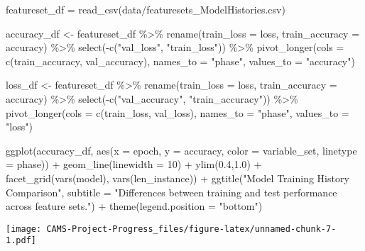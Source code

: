 \documentclass[
]{book}
\newenvironment{Shaded}{\begin{snugshade}}{\end{snugshade}}
\newcommand{\AttributeTok}[1]{\textcolor[rgb]{0.77,0.63,0.00}{#1}}
\newcommand{\DecValTok}[1]{\textcolor[rgb]{0.00,0.00,0.81}{#1}}
\newcommand{\FloatTok}[1]{\textcolor[rgb]{0.00,0.00,0.81}{#1}}
\newcommand{\FunctionTok}[1]{\textcolor[rgb]{0.00,0.00,0.00}{#1}}
\newcommand{\NormalTok}[1]{#1}
\newcommand{\OtherTok}[1]{\textcolor[rgb]{0.56,0.35,0.01}{#1}}
\newcommand{\SpecialCharTok}[1]{\textcolor[rgb]{0.00,0.00,0.00}{#1}}
\newcommand{\StringTok}[1]{\textcolor[rgb]{0.31,0.60,0.02}{#1}}
\begin{document}
\begin{Shaded}
\begin{Highlighting}[]
\NormalTok{featureset\_df }\OtherTok{=} \FunctionTok{read\_csv}\NormalTok{(}\StringTok{\textquotesingle{}data/featuresets\_ModelHistories.csv\textquotesingle{}}\NormalTok{)}

\NormalTok{accuracy\_df }\OtherTok{\textless{}{-}}\NormalTok{ featureset\_df }\SpecialCharTok{\%\textgreater{}\%}
  \FunctionTok{rename}\NormalTok{(}\AttributeTok{train\_loss =}\NormalTok{ loss, }\AttributeTok{train\_accuracy =}\NormalTok{ accuracy) }\SpecialCharTok{\%\textgreater{}\%}
  \FunctionTok{select}\NormalTok{(}\SpecialCharTok{{-}}\FunctionTok{c}\NormalTok{(}\StringTok{"val\_loss"}\NormalTok{, }\StringTok{"train\_loss"}\NormalTok{)) }\SpecialCharTok{\%\textgreater{}\%}
  \FunctionTok{pivot\_longer}\NormalTok{(}\AttributeTok{cols =} \FunctionTok{c}\NormalTok{(train\_accuracy, val\_accuracy), }\AttributeTok{names\_to =} \StringTok{"phase"}\NormalTok{, }\AttributeTok{values\_to =} \StringTok{"accuracy"}\NormalTok{)}

\NormalTok{loss\_df }\OtherTok{\textless{}{-}}\NormalTok{ featureset\_df }\SpecialCharTok{\%\textgreater{}\%}
  \FunctionTok{rename}\NormalTok{(}\AttributeTok{train\_loss =}\NormalTok{ loss, }\AttributeTok{train\_accuracy =}\NormalTok{ accuracy) }\SpecialCharTok{\%\textgreater{}\%}
  \FunctionTok{select}\NormalTok{(}\SpecialCharTok{{-}}\FunctionTok{c}\NormalTok{(}\StringTok{"val\_accuracy"}\NormalTok{, }\StringTok{"train\_accuracy"}\NormalTok{)) }\SpecialCharTok{\%\textgreater{}\%}
  \FunctionTok{pivot\_longer}\NormalTok{(}\AttributeTok{cols =} \FunctionTok{c}\NormalTok{(train\_loss, val\_loss), }\AttributeTok{names\_to =} \StringTok{"phase"}\NormalTok{, }\AttributeTok{values\_to =} \StringTok{"loss"}\NormalTok{)}
\end{Highlighting}
\end{Shaded}

\begin{Shaded}
\begin{Highlighting}[]
\FunctionTok{ggplot}\NormalTok{(accuracy\_df, }\FunctionTok{aes}\NormalTok{(}\AttributeTok{x =}\NormalTok{ epoch, }\AttributeTok{y =}\NormalTok{ accuracy, }\AttributeTok{color =}\NormalTok{ variable\_set, }\AttributeTok{linetype =}\NormalTok{ phase)) }\SpecialCharTok{+} 
  \FunctionTok{geom\_line}\NormalTok{(}\AttributeTok{linewidth =} \DecValTok{10}\NormalTok{) }\SpecialCharTok{+} 
  \FunctionTok{ylim}\NormalTok{(}\FloatTok{0.4}\NormalTok{,}\FloatTok{1.0}\NormalTok{) }\SpecialCharTok{+}
  \FunctionTok{facet\_grid}\NormalTok{(}\FunctionTok{vars}\NormalTok{(model), }\FunctionTok{vars}\NormalTok{(len\_instance)) }\SpecialCharTok{+}
  \FunctionTok{ggtitle}\NormalTok{(}\StringTok{"Model Training History Comparison"}\NormalTok{, }\AttributeTok{subtitle =} \StringTok{"Differences between training and test performance across feature sets."}\NormalTok{) }\SpecialCharTok{+} \FunctionTok{theme}\NormalTok{(}\AttributeTok{legend.position =} \StringTok{"bottom"}\NormalTok{)}
\end{Highlighting}
\end{Shaded}

\texttt{[image: CAMS-Project-Progress\_files/figure-latex/unnamed-chunk-7-1.pdf]}

  
\end{document}
